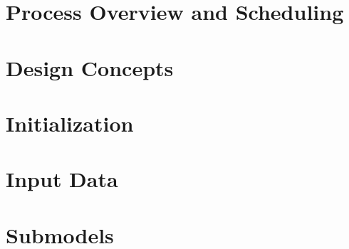 \documentclass{article}
\begin{document}
\section{Process Overview and Scheduling}


\section{Design Concepts}

 \section{Initialization}

\section{Input Data}

\section{Submodels}
\end{document}
